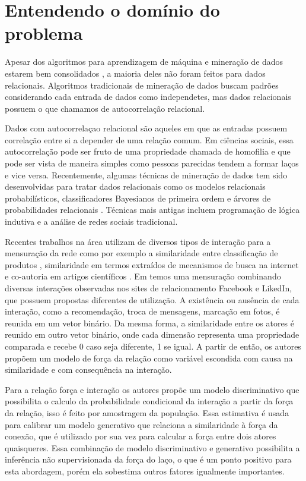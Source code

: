 \documentclass{article}
\begin{document}
\section{Entendendo o domínio do problema}

Apesar dos algoritmos para aprendizagem de máquina e mineração de dados estarem
bem consolidados \cite{Cios2005}, a maioria deles não foram feitos para dados
relacionais. Algoritmos tradicionais de mineração de dados buscam padrões
considerando cada entrada de dados como independetes, mas dados relacionais
possuem o que chamamos de autocorrelação relacional.

Dados com autocorrelaçao relacional são aqueles em que as entradas possuem
correlação entre si a depender de uma relação comum. Em ciências sociais, essa
autocorrelação pode ser fruto de uma propriedade chamada de homofilia e que
pode ser vista de maneira simples como pessoas parecidas tendem a formar laços
e vice versa. Recentemente, algumas técnicas de mineração de dados tem sido
desenvolvidas para tratar dados relacionais como os modelos relacionais
probabilísticos, classificadores Bayesianos de primeira ordem e árvores de
probabilidades relacionais \cite{Jensen2002}. Técnicas mais antigas incluem
programação de lógica indutiva e a análise de redes sociais tradicional.

Recentes trabalhos na área utilizam de diversos tipos de interação para a
mensuração da rede como por exemplo a similaridade entre classificação de
produtos \cite{Richardson2002}, similaridade em termos extraídos de mecanismos de
busca na internet \cite{MATSUO2007} e co-autoria em artigos científicos
\cite{Kempe2003}. Em \cite{Xiang2010} temos uma mensuração combinando diversas
interações observadas nos sites de relacionamento Facebook e LikedIn, que
possuem propostas diferentes de utilização. A existência ou ausência de cada
interação, como a recomendação, troca de mensagens, marcação em fotos, é reunida
em um vetor binário. Da mesma forma, a similaridade entre os atores é reunido em
outro vetor binário, onde cada dimensão representa uma propriedade comparada e
recebe 0 caso seja diferente, 1 se igual. A partir de então, os autores propõem
um modelo de força da relação como variável escondida com causa na similaridade
e com consequência na interação. 

Para a relação força e interação os autores propõe um modelo discriminativo que
possibilita o calculo da probabilidade condicional da interação a partir da
força da relação, isso é feito por amostragem da população. Essa estimativa é
usada para calibrar um modelo generativo que relaciona a similaridade à força da
conexão, que é utilizado por sua vez para calcular a força entre dois atores
quaisqueres. Essa combinação de modelo discriminativo e generativo possibilita a
inferência não supervisionada da força do laço, o que é um ponto positivo para
esta abordagem, porém ela sobestima outros fatores igualmente importantes.
\end{document}
